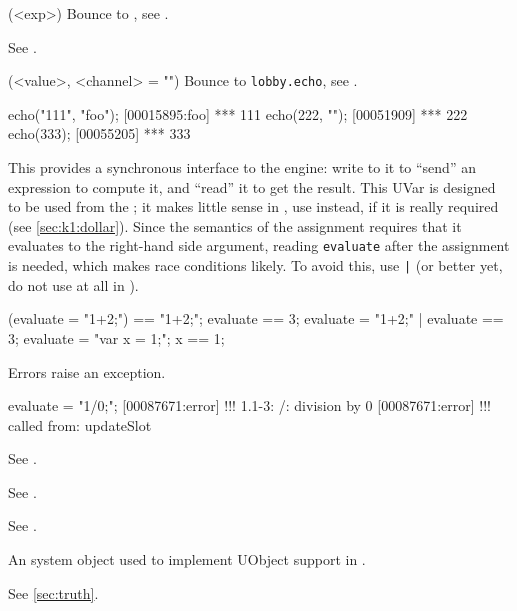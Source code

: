 \begin{urbiscriptapi}
\item[disown](<exp>)%
  Bounce to , see .


\item[Duration] See .


\item[echo](<value>, <channel> = "")%
  Bounce to \lstinline|lobby.echo|, see .
\begin{urbiscript}
echo("111", "foo");
[00015895:foo] *** 111
echo(222, "");
[00051909] *** 222
echo(333);
[00055205] *** 333
\end{urbiscript}


\item[evaluate] This  provides a synchronous interface to
  the \urbi engine: write to it to ``send'' an expression to compute it, and
  ``read'' it to get the result.  This UVar is designed to be used from the
  \Cxx; it makes little sense in \us, use  instead, if
  it is really required (see \autoref{sec:k1:dollar}).  Since the semantics
  of the assignment requires that it evaluates to the right-hand side
  argument, reading \lstinline|evaluate| after the assignment is needed,
  which makes race conditions likely.  To avoid this, use \lstinline{|} (or
  better yet, do not use  at all in \us).

\begin{urbiassert}
(evaluate = "1+2;") == "1+2;";
 evaluate == 3;
{ evaluate = "1+2;" | evaluate } == 3;
{ evaluate = "var x = 1;"; x } == 1;
\end{urbiassert}

  Errors raise an exception.

\begin{urbiscript}
evaluate = "1/0;";
[00087671:error] !!! 1.1-3: /: division by 0
[00087671:error] !!!    called from: updateSlot
\end{urbiscript}


\item[Event] See .


\item[Exception] See .


\item[Executable] See .


\item[external] An system object used to implement UObject support in
  \us.


\item[false]  See \autoref{sec:truth}.



\end{urbiscriptapi}
